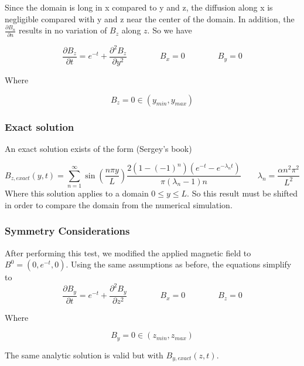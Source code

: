 \documentclass[11pt]{article}
\begin{document}
Since the domain is long in x compared to y and z, the diffusion along x is negligible compared with y and z near the center of the domain. In addition, the $\frac{\partial B_n}{\partial n}$ results in no variation of $B_z$ along $z$. So we have

\begin{equation}
	\frac{\partial B_z}{\partial t}
	=
	e^{-t}
	+
	\frac{\partial^2 B_z}{\partial y^2}
	\qquad \qquad
	B_x = 0
	\qquad \qquad
	B_y = 0
\end{equation}

Where

\begin{equation}
	B_z = 0
	\in (y_{min}, y_{max})
\end{equation}

\subsubsection{Exact solution}

An exact solution exists of the form (Sergey's book)

\begin{equation}
	\boxed{
	B_{z,exact}(y,t)
	=
	\sum_{n=1}^{\infty}
	\sin \left( \frac{n\pi y}{L} \right)
	\frac{2 (1 - (-1)^n) (e^{-t}-e^{-\lambda_n t})}{\pi (\lambda_n-1)n}
	}
	\qquad
	\boxed{
	\lambda_n = \frac{\alpha n^2\pi^2}{L^2}
	}
\end{equation}
Where this solution applies to a domain $0 \le y \le L$. So this result must be shifted in order to compare the domain from the numerical simulation.

\subsubsection{Symmetry Considerations}

After performing this test, we modified the applied magnetic field to $B^0=(0,e^{-t},0)$. Using the same assumptions as before, the equations simplify to
\begin{equation}
	\frac{\partial B_y}{\partial t}
	=
	e^{-t}
	+
	\frac{\partial^2 B_y}{\partial z^2}
	\qquad \qquad
	B_x = 0
	\qquad \qquad
	B_z = 0
\end{equation}

Where

\begin{equation}
	B_y = 0
	\in (z_{min}, z_{max})
\end{equation}

The same analytic solution is valid but with $B_{y,exact}(z,t)$.
\end{document}
